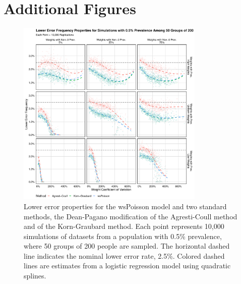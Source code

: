 \section{Additional Figures}

\begin{figure}
\centering
\includegraphics[width=0.8\textwidth]{perfect_lower_error_frequency_50_groups_0_005_prev}
\caption{Lower error properties for the wsPoisson model and two standard methods, the Dean-Pagano modification of the Agresti-Coull method and of the Korn-Graubard method.
Each point represents 10,000 simulations of datasets from a population with 0.5\% prevalence, where 50 groups of 200 people are sampled.
The horizontal dashed line indicates the nominal lower error rate, 2.5\%.
Colored dashed lines are estimates from a logistic regression model using quadratic splines.}
\label{ch_3:fig:perfect_lower_error_frequency_50_groups_0_005_prev}
\end{figure}

